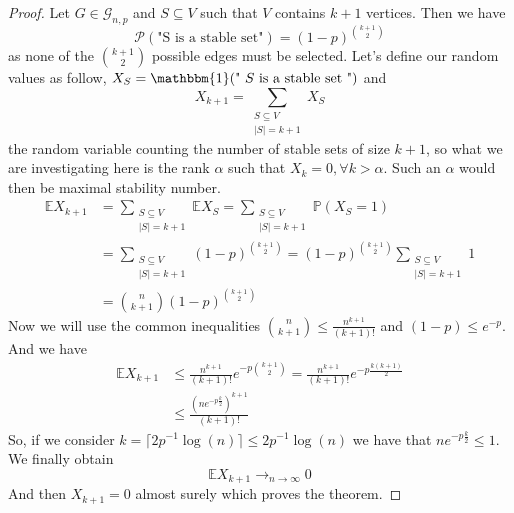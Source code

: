 \begin{proof}
	Let $G \in \mathcal{G}_{n,p}$ and $S \subseteq V$ such that $V$ contains $k+1$ vertices.
	Then we have 
	\begin{equation}
		\mathcal{P}(\text{"S is a stable set"}) = (1-p)^{\binom{k+1}{2}  }
	\end{equation}
	as none of the $\binom{k+1}{2}$ possible edges must be selected.
	\newline
	Let's define our random values as follow, $X_S = \mathbbm{1}(\text{" $S$ is a stable set "})$ and
	\begin{equation}
		X_{k+1} = \sum_{\substack{ S \subseteq V \\ |S| = k + 1}} X_S
	\end{equation}
	the random variable counting the number of stable sets of size $k+1$, so what we are investigating here is the rank $\alpha$ such that $X_k = 0, \forall k > \alpha$. Such an $\alpha$ would then be maximal stability number.
	\begin{align}
		\mathbb{E}X_{k+1} &= \sum_{\substack{ S \subseteq V \\ |S| = k + 1}} \mathbb{E} X_S 	
				  = \sum_{\substack{ S \subseteq V \\ |S| = k + 1}} \mathbb{P}(X_S = 1)	\\		
		&= \sum_{\substack{ S \subseteq V \\ |S| = k + 1}} (1-p)^{\binom{k+1}{2}  }		
		= (1-p)^{\binom{k+1}{2}} \sum_{\substack{ S \subseteq V \\ |S| = k + 1}} 1 	\\	
		&= \binom{n}{k+1} (1-p)^{\binom{k+1}{2}} 
	\end{align}
	Now we will use the common inequalities $  \binom{n}{k+1} \leq \frac{n^{k+1}}{(k+1)!} $ and $(1-p) \leq e^{-p}$. 
	And we have
	\begin{align}
		\mathbb{E}X_{k+1} 	&\leq  \frac{n^{k+1}}{(k+1)!} e^{-p \binom{k+1}{2}} = \frac{n^{k+1}}{(k+1)!} e^{-p \frac{k(k+1)}{2}}\\
									     &\leq  \frac{(ne^{-p\frac{k}{2}})^{k+1}}{(k+1)!}
	\end{align}
	So, if we consider $k = \lceil 2p^{-1}\log(n)\rceil \leq 2p^{-1}\log(n)$ we have that $ ne^{-p\frac{k}{2}} \leq 1$.
	We finally obtain 
	\begin{equation}
		\mathbb{E} X_{k+1} \longrightarrow_{n \to \infty} 0
	\end{equation}
	And then $X_{k+1} = 0$ almost surely which proves the theorem.

\end{proof}

